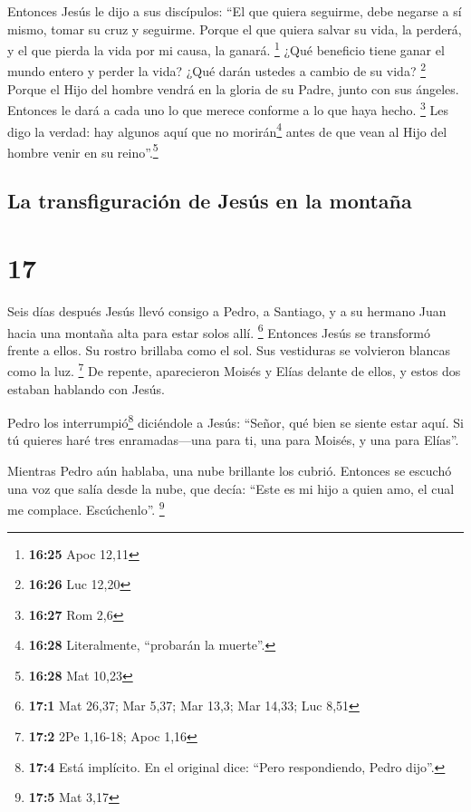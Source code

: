  Entonces Jesús le dijo a sus discípulos: ``El que quiera
seguirme, debe negarse a sí mismo, tomar su cruz y seguirme.
 Porque el que quiera salvar su vida, la perderá, y el
que pierda la vida por mi causa, la ganará. \footnote{\textbf{16:25}
  Apoc 12,11}  ¿Qué beneficio tiene ganar el mundo entero
y perder la vida? ¿Qué darán ustedes a cambio de su vida? \footnote{\textbf{16:26}
  Luc 12,20}  Porque el Hijo del hombre vendrá en la
gloria de su Padre, junto con sus ángeles. Entonces le dará a cada uno
lo que merece conforme a lo que haya hecho. \footnote{\textbf{16:27} Rom
  2,6}  Les digo la verdad: hay algunos aquí que no
morirán\footnote{\textbf{16:28} Literalmente, ``probarán la muerte''.}
antes de que vean al Hijo del hombre venir en su reino''.\footnote{\textbf{16:28}
  Mat 10,23}

\hypertarget{la-transfiguraciuxf3n-de-jesuxfas-en-la-montauxf1a}{%
\subsection{La transfiguración de Jesús en la
montaña}\label{la-transfiguraciuxf3n-de-jesuxfas-en-la-montauxf1a}}

\hypertarget{section-16}{%
\section{17}\label{section-16}}

 Seis días después Jesús llevó consigo a Pedro, a
Santiago, y a su hermano Juan hacia una montaña alta para estar solos
allí. \footnote{\textbf{17:1} Mat 26,37; Mar 5,37; Mar 13,3; Mar 14,33;
  Luc 8,51}  Entonces Jesús se transformó frente a ellos.
Su rostro brillaba como el sol. Sus vestiduras se volvieron blancas como
la luz. \footnote{\textbf{17:2} 2Pe 1,16-18; Apoc 1,16} 
De repente, aparecieron Moisés y Elías delante de ellos, y estos dos
estaban hablando con Jesús.

 Pedro los interrumpió\footnote{\textbf{17:4} Está
  implícito. En el original dice: ``Pero respondiendo, Pedro dijo''.}
diciéndole a Jesús: ``Señor, qué bien se siente estar aquí. Si tú
quieres haré tres enramadas---una para ti, una para Moisés, y una para
Elías''.

 Mientras Pedro aún hablaba, una nube brillante los
cubrió. Entonces se escuchó una voz que salía desde la nube, que decía:
``Este es mi hijo a quien amo, el cual me complace. Escúchenlo''.
\footnote{\textbf{17:5} Mat 3,17}

